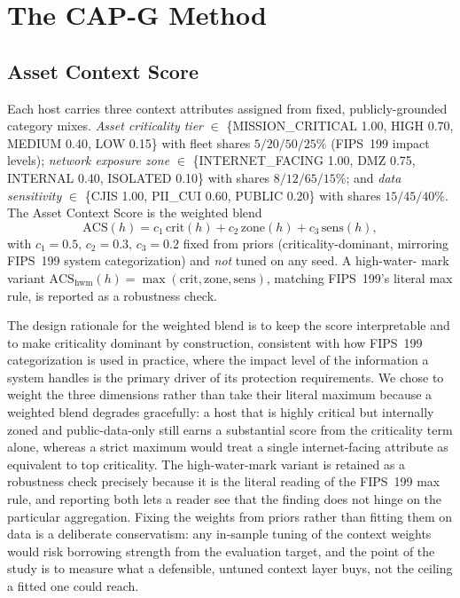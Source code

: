 \section{The CAP-G Method}
\label{sec:method}

\subsection{Asset Context Score}

Each host carries three context attributes assigned from fixed, publicly-grounded
category mixes. \emph{Asset criticality tier} $\in$ \{MISSION\_CRITICAL 1.00, HIGH 0.70,
MEDIUM 0.40, LOW 0.15\} with fleet shares $5/20/50/25\%$ (FIPS~199 impact levels);
\emph{network exposure zone} $\in$ \{INTERNET\_FACING 1.00, DMZ 0.75, INTERNAL 0.40,
ISOLATED 0.10\} with shares $8/12/65/15\%$; and \emph{data sensitivity} $\in$
\{CJIS 1.00, PII\_CUI 0.60, PUBLIC 0.20\} with shares $15/45/40\%$. The Asset Context
Score is the weighted blend
%
\begin{equation}
\mathrm{ACS}(h) = c_1\,\mathrm{crit}(h) + c_2\,\mathrm{zone}(h) + c_3\,\mathrm{sens}(h),
\end{equation}
%
with $c_1{=}0.5,\,c_2{=}0.3,\,c_3{=}0.2$ fixed from priors (criticality-dominant,
mirroring FIPS~199 system categorization) and \emph{not} tuned on any seed. A high-water-
mark variant $\mathrm{ACS_{hwm}}(h)=\max(\mathrm{crit},\mathrm{zone},\mathrm{sens})$,
matching FIPS~199's literal max rule, is reported as a robustness check.

The design rationale for the weighted blend is to keep the score interpretable and to make
criticality dominant by construction, consistent with how FIPS~199 categorization is used in
practice, where the impact level of the information a system handles is the primary driver of
its protection requirements. We chose to weight the three dimensions rather than take their
literal maximum because a weighted blend degrades gracefully: a host that is highly critical but
internally zoned and public-data-only still earns a substantial score from the criticality term
alone, whereas a strict maximum would treat a single internet-facing attribute as equivalent to
top criticality. The high-water-mark variant is retained as a robustness check precisely because
it is the literal reading of the FIPS~199 max rule, and reporting both lets a reader see that the
finding does not hinge on the particular aggregation. Fixing the weights from priors rather than
fitting them on data is a deliberate conservatism: any in-sample tuning of the context weights
would risk borrowing strength from the evaluation target, and the point of the study is to
measure what a defensible, untuned context layer buys, not the ceiling a fitted one could reach.

